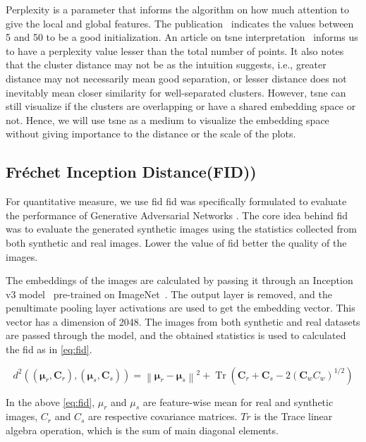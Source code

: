 Perplexity is a parameter that informs the algorithm on how much attention to give the local and global features.
The publication~\cite{vanDerMaaten2008} indicates the values between 5 and 50 to be a good initialization.
An article on \gls{tsne} interpretation~\cite{wattenberg2016how} informs us to have a perplexity value lesser than the total number of points.
    It also notes that the cluster distance may not be as the intuition suggests, i.e., greater distance may not necessarily mean good separation, or lesser distance does not inevitably mean closer similarity for well-separated clusters.
    However, \gls{tsne} can still visualize if the clusters are overlapping or have a shared embedding space or not.
    Hence, we will use \gls{tsne} as a medium to visualize the embedding space without giving importance to the distance or the scale of the plots.

\subsection{Fr\'echet Inception Distance(FID))}\label{subsec:fr'echet-inception-distance)}
For quantitative measure, we use \gls{fid}
\gls{fid} \cite{Heusel2017GANsTB} was specifically formulated to evaluate the performance of Generative Adversarial Networks \cite{Goodfellow2014GenerativeAN}.
The core idea behind \gls{fid} was to evaluate the generated synthetic images using the statistics collected from both synthetic and real images.
Lower the value of \gls{fid} better the quality of the images.

The embeddings of the images are calculated by passing it through an Inception v3 model~\cite{Szegedy2016RethinkingTI} pre-trained on ImageNet~\cite{Deng2009ImageNetAL}.
The output layer is removed, and the penultimate pooling layer activations are used to get the embedding vector.
This vector has a dimension of 2048.
The images from both synthetic and real datasets are passed through the model, and the obtained statistics is used to calculated the \gls{fid} as in \autoref{eq:fid}.

\begin{equation}
    d^{2}\left((\boldsymbol{\mu}_{r}, \boldsymbol{C}_{r}),\left(\boldsymbol{\mu}_{s}, \boldsymbol{C}_{s}\right)\right)=\left\|\boldsymbol{\mu}_{r}-\boldsymbol{\mu}_{s}\right\|^{2}+\operatorname{Tr}\left(\boldsymbol{C}_{r}+\boldsymbol{C}_{s}-2\left(\boldsymbol{C}_{w} {C}_{w}\right)^{1 / 2}\right)
    \label{eq:fid}
\end{equation}

In the above \autoref{eq:fid}, $\mu_r$ and $\mu_s$ are feature-wise mean for real and synthetic images, $C_r$ and $C_s$ are respective covariance matrices.
$Tr$ is the Trace linear algebra operation, which is the sum of main diagonal elements.



